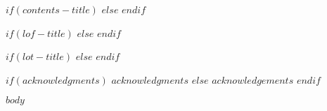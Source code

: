 \documentclass[12pt,oneside,letterpaper]{memoir}
\makeatletter
\newcommand{\wb@episource}{}
\newenvironment{wbepi}[1]{\begin{quote}\renewcommand{\wb@episource}{#1}\itshape}{\par\upshape \raggedleft --- \textsc{\wb@episource}\\ \end{quote}}
\makeatother
\begin{document}
\setpnumwidth{2em}

%

$if(contents-title)$
  \renewcommand{\contentsname}{$contents-title$}
$else$
  \renewcommand{\contentsname}{Contents}
$endif$

$if(lof-title)$
  \renewcommand{\listfigurename}{$lof-title$}
$else$
  \renewcommand{\listfigurename}{List of Figures}
$endif$

$if(lot-title)$
  \renewcommand{\listtablename}{$lot-title$}
$else$
  \renewcommand{\listtablename}{List of Tables}
$endif$

\tableofcontents

\clearpage
\listoftables

\clearpage
\listoffigures

\clearpage


\begin{acks}

%
%

$if(acknowledgments)$
  $acknowledgments$
$else$
  $acknowledgements$
$endif$

\end{acks}


\clearpage{}

$body$

\end{document}
